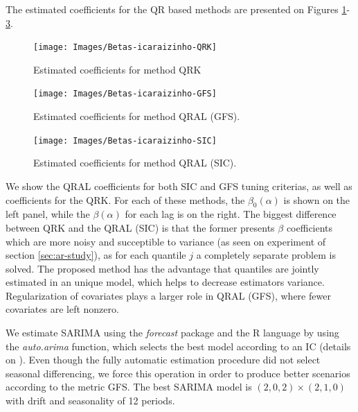 The estimated coefficients for the QR based methods are presented on Figures \ref{fig:betas-qrk}-\ref{fig:betas-sic}. 
\begin{figure}[h]
	\centering
	\texttt{[image: Images/Betas-icaraizinho-QRK]}
	\caption{Estimated coefficients for method QRK}
	\label{fig:betas-qrk}
\end{figure}
\begin{figure}[h]
	\centering
	\texttt{[image: Images/Betas-icaraizinho-GFS]}
	\caption{Estimated coefficients for method QRAL (GFS).}
	\label{fig:betas-gfs}
\end{figure}
\begin{figure}[h]
	\centering
	\texttt{[image: Images/Betas-icaraizinho-SIC]}
	\caption{Estimated coefficients for method QRAL (SIC).}
	\label{fig:betas-sic}
\end{figure}
We show the QRAL coefficients for both SIC and GFS tuning criterias, as well as coefficients for the QRK. For each of these methods, the $\beta_0(\alpha)$ is shown on the left panel, while the $\beta(\alpha)$ for each lag is on the right.
The biggest difference between QRK and the QRAL (SIC) is that the former presents $\beta$ coefficients which are more noisy and succeptible to variance (as seen on experiment of section \ref{sec:ar-study}), as for each quantile $j$ a completely separate problem is solved. The proposed method has the advantage that quantiles are jointly estimated in an unique model, which helps to decrease estimators variance. Regularization of covariates plays a larger role in QRAL (GFS), where fewer covariates are left nonzero.

We estimate SARIMA using the \emph{forecast} \cite{hyndman2008forecastpackage} package and the R language by using the \emph{auto.arima} function, which selects the best model according to an IC (details on \cite{hyndman2008forecastmanual}). Even though the fully automatic estimation procedure did not select seasonal differencing, we force this operation in order to produce better scenarios according to the metric GFS. The best SARIMA model is $(2,0,2)\times(2,1,0)$ with drift and seasonality of 12 periods.


